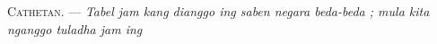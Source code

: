 %
%
%
%
%
%

\VUsaut{4.0mm}
\VUsaut{2.4mm}
\VUsaut{3.4mm}
\textsc{Cathetan.} --- \textit{Tabel jam kang dianggo ing saben negara
beda-beda ; mula kita nganggo tuladha jam ing} 

